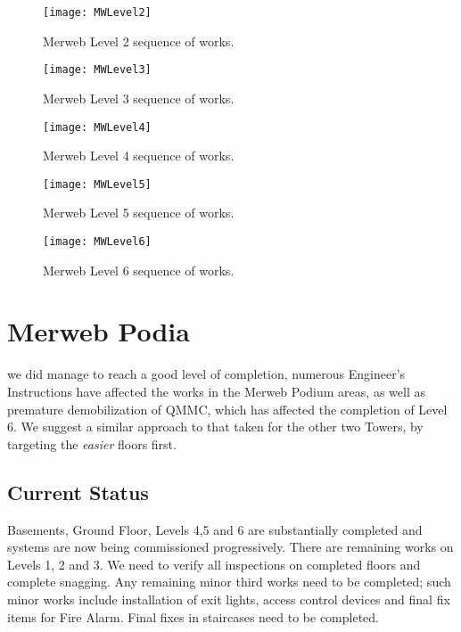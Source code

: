 %
\begin{figure*}[htbp]
 \texttt{[image: MWLevel2]}
  \caption{Merweb Level 2 sequence of works.}
  \label{fig:MWlevel2}
\end{figure*}

%
\begin{figure*}[htbp]
 \texttt{[image: MWLevel3]}
  \caption{Merweb Level 3 sequence of works.}
  \label{fig:MWlevel3}
\end{figure*}


%
\begin{figure*}[htbp]
 \texttt{[image: MWLevel4]}
  \caption{Merweb Level 4 sequence of works.}
  \label{fig:MWlevel4}
\end{figure*}


%
\begin{figure*}[htbp]
 \texttt{[image: MWLevel5]}
  \caption{Merweb Level 5 sequence of works.}
  \label{fig:MWlevel2}
\end{figure*}


%
\begin{figure*}[htbp]
 \texttt{[image: MWLevel6]}
  \caption{Merweb Level 6 sequence of works.}
  \label{fig:MWlevel6}
\end{figure*}

\chapter{Merweb Podia}

 we did manage to reach a good level of completion, numerous Engineer's Instructions have affected the works in the Merweb Podium areas, as well as premature demobilization of QMMC, which has affected the completion of Level 6. We suggest a similar approach to that taken for the other two Towers, by targeting the \textit{easier} floors first.

\section{Current Status}

Basements, Ground Floor, Levels 4,5 and 6 are substantially completed and systems are now being commissioned progressively. 
There are remaining works on Levels 1, 2 and 3. We need to
verify all inspections on completed floors and complete snagging. Any remaining minor third works need to be completed; such minor works include installation of exit lights, access control devices and final fix items for Fire Alarm. Final fixes in staircases need to be completed.


